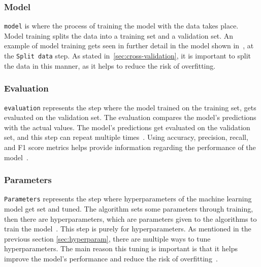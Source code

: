 \subsubsection{Model}\label{subsubsec:machine-learning-pipeline-model-training}
\texttt{model} is where the process of training the model with the data takes place. Model training splits the data into a training set and a validation set. An example of model training gets seen in further detail in the model shown in~\cite{machine-learning-pipeline-architecture}, at the \texttt{Split data} step. As stated in~\ref{sec:cross-validation}, it is important to split the data in this manner, as it helps to reduce the risk of overfitting.

\subsubsection{Evaluation}\label{subsubsec:machine-learning-pipeline-evaluation}
\texttt{evaluation} represents the step where the model trained on the training set, gets evaluated on the validation set. The evaluation compares the model's predictions with the actual values. The model's predictions get evaluated on the validation set, and this step can repeat multiple times~\cite{machine-learning-pipeline-architecture}. Using accuracy, precision, recall, and F1 score metrics helps provide information regarding the performance of the model~\cite{performance-evaluation}.

\subsubsection{Parameters}\label{subsubsec:machine-learning-pipeline-parameters}
\texttt{Parameters} represents the step where hyperparameters of the machine learning model get set and tuned. The algorithm sets some parameters through training, then there are hyperparameters, which are parameters given to the algorithms to train the model~\cite{what-is-hyperparameter-tuning}. This step is purely for hyperparameters. As mentioned in the previous section \ref{sec:hyperparam}, there are multiple ways to tune hyperparameters. The main reason this tuning is important is that it helps improve the model's performance and reduce the risk of overfitting~\cite{hyperparameter-tuning}.






